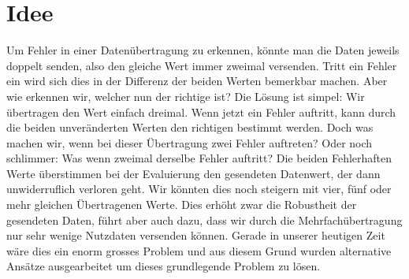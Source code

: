 %
%
\section{Idee
\label{reedsolomon:section:idee}}
Um Fehler in einer Datenübertragung zu erkennen, könnte man die Daten jeweils doppelt senden,
also den gleiche Wert immer zweimal versenden. 
Tritt ein Fehler ein wird sich dies in der Differenz der beiden Werten bemerkbar machen.
Aber wie erkennen wir, welcher nun der richtige ist? Die Lösung ist simpel: Wir übertragen den Wert einfach dreimal.
Wenn jetzt ein Fehler auftritt, kann durch die beiden unveränderten Werten den richtigen bestimmt werden.
Doch was machen wir, wenn bei dieser Übertragung zwei Fehler auftreten? 
Oder noch schlimmer: Was wenn zweimal derselbe Fehler auftritt? Die beiden Fehlerhaften Werte überstimmen bei der Evaluierung den gesendeten Datenwert, der dann unwiderruflich verloren geht. 
Wir könnten dies noch steigern mit vier, fünf oder mehr gleichen Übertragenen Werte. Dies erhöht zwar die Robustheit der gesendeten Daten, führt aber auch dazu, dass wir durch die Mehrfachübertragung nur sehr wenige Nutzdaten versenden können.
Gerade in unserer heutigen Zeit wäre dies ein enorm grosses Problem und aus diesem Grund wurden alternative Ansätze ausgearbeitet um dieses grundlegende Problem zu lösen. 
%
%
%
%
%
%
%
%
%
%
% 
%
%
%
%
%
